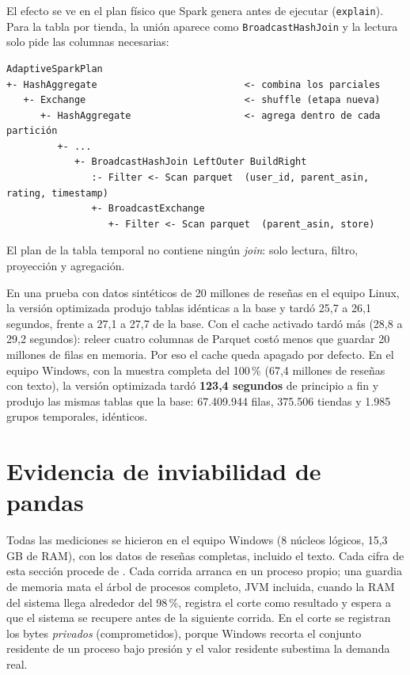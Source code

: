 \documentclass[11pt,a4paper]{article}
\begin{document}
El efecto se ve en el plan físico que Spark genera antes de ejecutar (\texttt{explain}). Para
la tabla por tienda, la unión aparece como \texttt{BroadcastHashJoin} y la lectura solo pide
las columnas necesarias:

\begin{lstlisting}[language={},caption={Plan físico de la tabla por tienda (versión optimizada).}]
AdaptiveSparkPlan
+- HashAggregate                          <- combina los parciales
   +- Exchange                            <- shuffle (etapa nueva)
      +- HashAggregate                    <- agrega dentro de cada partición
         +- ...
            +- BroadcastHashJoin LeftOuter BuildRight
               :- Filter <- Scan parquet  (user_id, parent_asin, rating, timestamp)
               +- BroadcastExchange
                  +- Filter <- Scan parquet  (parent_asin, store)
\end{lstlisting}

El plan de la tabla temporal no contiene ningún \emph{join}: solo lectura, filtro,
proyección y agregación.

En una prueba con datos sintéticos de 20 millones de reseñas en el equipo Linux, la versión
optimizada produjo tablas idénticas a la base y tardó 25,7 a 26,1 segundos, frente a 27,1 a
27,7 de la base. Con el cache activado tardó más (28,8 a 29,2 segundos): releer cuatro
columnas de Parquet costó menos que guardar 20 millones de filas en memoria. Por eso el cache
queda apagado por defecto. En el equipo Windows, con la muestra completa del 100\,\%
(67,4 millones de reseñas con texto), la versión optimizada tardó \textbf{123,4 segundos} de
principio a fin y produjo las mismas tablas que la base: 67.409.944 filas, 375.506 tiendas y
1.985 grupos temporales, idénticos.

\section{Evidencia de inviabilidad de pandas}
\label{sec:evidencia}

Todas las mediciones se hicieron en el equipo Windows (8 núcleos lógicos, 15,3 GB de RAM),
con los datos de reseñas completas, incluido el texto. Cada cifra de esta sección procede de
. Cada corrida arranca en un proceso propio;
una guardia de memoria mata el árbol de procesos completo, JVM incluida, cuando la RAM del
sistema llega alrededor del 98\,\%, registra el corte como resultado y espera a que el
sistema se recupere antes de la siguiente corrida. En el corte se registran los bytes
\emph{privados} (comprometidos), porque Windows recorta el conjunto residente de un proceso
bajo presión y el valor residente subestima la demanda real.
\end{document}
